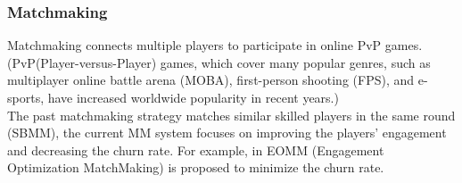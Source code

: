 \documentclass[10pt]{report}
\begin{document}
\subsubsection{Matchmaking}

Matchmaking connects multiple players to participate in online PvP games. (PvP(Player-versus-Player) games,
which cover many popular genres, such as multiplayer online battle arena (MOBA), first-person shooting (FPS),
and e-sports, have increased worldwide popularity in recent years.)\\

The past matchmaking strategy matches similar skilled players in the same round (SBMM), the current MM system focuses on improving
the players' engagement and decreasing the churn rate. For example, in \cite{Chen2017} EOMM (Engagement Optimization MatchMaking) is
proposed to minimize the churn rate.\\
\end{document}

